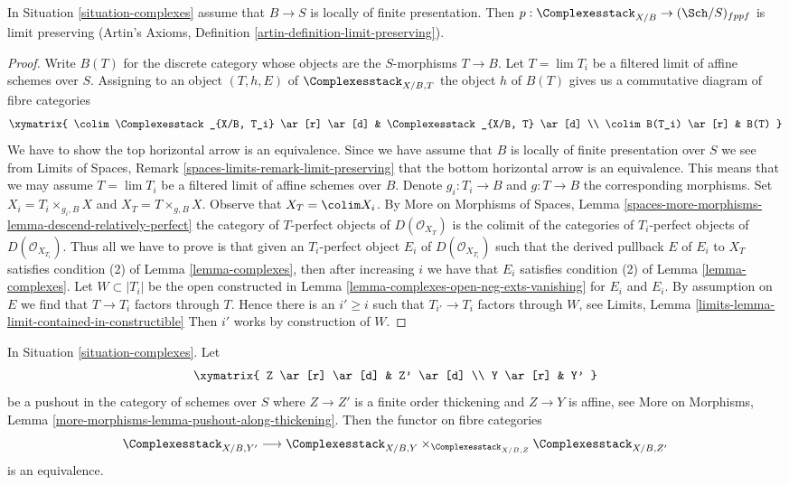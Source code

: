 \begin{lemma}
\label{lemma-complexes-limits}
In Situation \ref{situation-complexes} assume that $B \to S$
is locally of finite presentation. Then
$p : \Complexesstack_{X/B} \to (\Sch/S)_{fppf}$ is limit preserving
(Artin's Axioms, Definition \ref{artin-definition-limit-preserving}).
\end{lemma}

\begin{proof}
Write $B(T)$ for the discrete category whose
objects are the $S$-morphisms $T \to B$. Let $T = \lim T_i$ be a filtered
limit of affine schemes over $S$. Assigning to an object
$(T, h, E)$ of $\Complexesstack_{X/B, T}$ the object $h$
of $B(T)$ gives us a commutative diagram of fibre categories
$$
\xymatrix{
\colim \Complexesstack_{X/B, T_i} \ar[r] \ar[d] &
\Complexesstack_{X/B, T} \ar[d] \\
\colim B(T_i) \ar[r] & B(T)
}
$$
We have to show the top horizontal arrow is an equivalence. Since
we have assume that $B$ is locally of finite presentation over $S$
we see from
Limits of Spaces, Remark \ref{spaces-limits-remark-limit-preserving}
that the bottom horizontal arrow is an equivalence. This means that
we may assume $T = \lim T_i$ be a filtered limit of affine schemes over
$B$. Denote $g_i : T_i \to B$ and $g : T \to B$ the corresponding
morphisms. Set $X_i = T_i \times_{g_i, B} X$ and $X_T = T \times_{g, B} X$.
Observe that $X_T = \colim X_i$.
By More on Morphisms of Spaces, Lemma
\ref{spaces-more-morphisms-lemma-descend-relatively-perfect}
the category of $T$-perfect objects of $D(\mathcal{O}_{X_T})$
is the colimit of the categories of $T_i$-perfect objects
of $D(\mathcal{O}_{X_{T_i}})$.
Thus all we have to prove is that given an $T_i$-perfect object
$E_i$ of $D(\mathcal{O}_{X_{T_i}})$ such that
the derived pullback $E$ of $E_i$ to $X_T$ satisfies
condition (2) of Lemma \ref{lemma-complexes},
then after increasing $i$ we have that
$E_i$ satisfies
condition (2) of Lemma \ref{lemma-complexes}.
Let $W \subset |T_i|$ be the open constructed
in Lemma \ref{lemma-complexes-open-neg-exts-vanishing}
for $E_i$ and $E_i$. By assumption on $E$ we find
that $T \to T_i$ factors through $T$.
Hence there is an $i' \geq i$
such that $T_{i'} \to T_i$ factors through $W$, see
Limits, Lemma \ref{limits-lemma-limit-contained-in-constructible}
Then $i'$ works by construction of $W$.
\end{proof}

\begin{lemma}
\label{lemma-complexes-RS-star}
In Situation \ref{situation-complexes}. Let
$$
\xymatrix{
Z \ar[r] \ar[d] & Z' \ar[d] \\
Y \ar[r] & Y'
}
$$
be a pushout in the category of schemes over $S$ where
$Z \to Z'$ is a finite order thickening and $Z \to Y$ is affine, see
More on Morphisms, Lemma \ref{more-morphisms-lemma-pushout-along-thickening}.
Then the functor on fibre categories
$$
\Complexesstack_{X/B, Y'}
\longrightarrow
\Complexesstack_{X/B, Y}
\times_{\Complexesstack_{X/B, Z}}
\Complexesstack_{X/B, Z'}
$$
is an equivalence.
\end{lemma}

